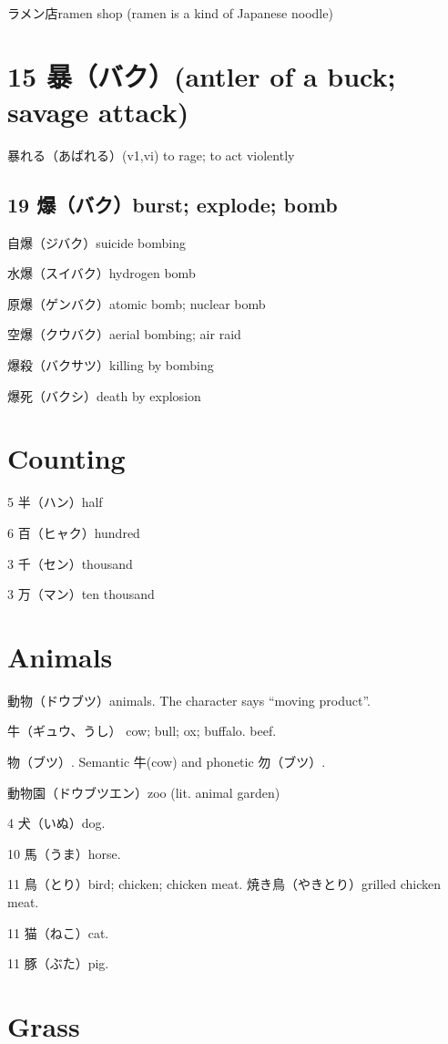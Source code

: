 ラメン店ramen shop (ramen is a kind of Japanese noodle)

\section{15 暴（バク）(antler of a buck; savage attack)}

暴れる（あばれる）(v1,vi) to rage; to act violently

\subsection{19 爆（バク）burst; explode; bomb}

自爆（ジバク）suicide bombing

水爆（スイバク）hydrogen bomb

原爆（ゲンバク）atomic bomb; nuclear bomb

空爆（クウバク）aerial bombing; air raid

爆殺（バクサツ）killing by bombing

爆死（バクシ）death by explosion

\section{Counting}

5 半（ハン）half

6 百（ヒャク）hundred

3 千（セン）thousand

3 万（マン）ten thousand

\section{Animals}

動物（ドウブツ）animals.
The character says ``moving product''.

牛（ギュウ、うし）
cow; bull; ox; buffalo.
beef.

物（ブツ）.
Semantic 牛(cow) and phonetic 勿（ブツ）.

動物園（ドウブツエン）zoo (lit. animal garden)

4 犬（いぬ）dog.

10 馬（うま）horse.

11 鳥（とり）bird; chicken; chicken meat.
焼き鳥（やきとり）grilled chicken meat.

11 猫（ねこ）cat.

11 豚（ぶた）pig.

\section{Grass}

